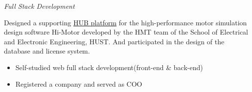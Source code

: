 \documentclass{uniquecv}
\begin{document}
\textit{Full Stack Development}
\vspace{0.4ex}

Designed a supporting \href{https://hub.hi-motor.site/index/home}{HUB platform} for the high-performance motor simulation design software Hi-Motor developed by the HMT team of the School of Electrical and Electronic Engineering, HUST. And participated in the design of the database and license system.
\begin{itemize}
    \item Self-studied web full stack development(front-end \& back-end)
    \item Registered a company and served as COO
\end{itemize}


\end{document}

